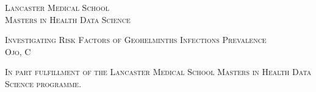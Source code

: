 
\begin{titlepage}

        \begin{center}

            \vspace*{1cm}

            \begin{minipage}{0.95\textwidth}

                \begin{center}
                    {\sffamily \small \textsc{Lancaster Medical School\\Masters in Health Data Science}}
                    \vspace{3.5cm}

                    {\sffamily \large \textsc{Investigating Risk Factors of Geohelminths Infections Prevalence}\\
                    \small \textsc{Ojo, C}}
                    \vspace{9.5cm}

                    {\sffamily \small \textsc{In part fulfillment of the Lancaster Medical School Masters in Health Data Science programme.}}

                \end{center}

            \end{minipage}

        \end{center}

\end{titlepage}